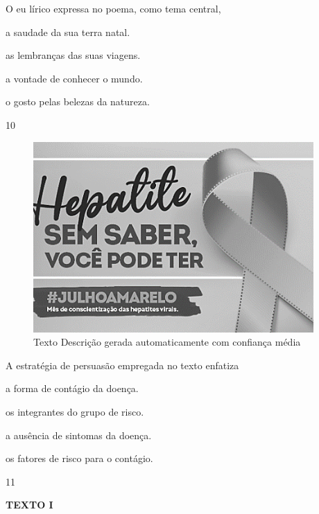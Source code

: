 O eu lírico expressa no poema, como tema central,

\begin{escolha}
\item a saudade da sua terra natal.

\item as lembranças das suas viagens.

\item a vontade de conhecer o mundo.

\item o gosto pelas belezas da natureza.
\end{escolha}

\num{10}

\begin{figure}
\centering
\includegraphics[width=4.21103in,height=2.86458in]{./imgSAEB_8_POR/media/image31.png}
\caption{Texto Descrição gerada automaticamente com confiança média}
\end{figure}


A estratégia de persuasão empregada no texto enfatiza

\begin{escolha}
\item
  a forma de contágio da doença.
\item
  os integrantes do grupo de risco.
\item
  a ausência de sintomas da doença.
\item
  os fatores de risco para o contágio.
\end{escolha}

\num{11}

\textbf{TEXTO I}

